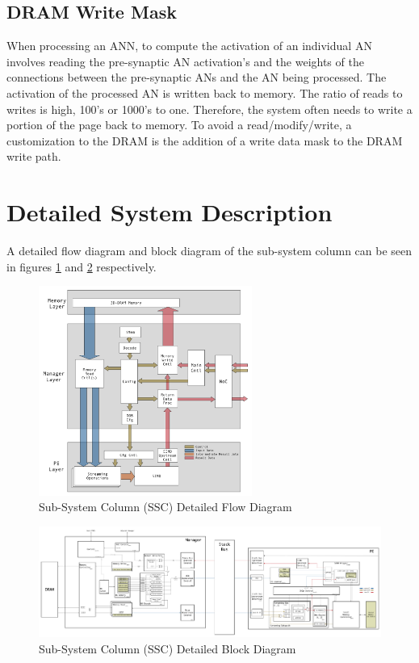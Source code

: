 \documentclass[journal]{IEEEtran}
\begin{document}
\subsection{DRAM Write Mask}
\label{sec:dramWriteMask}
When processing an ANN, to compute the activation of an individual AN involves reading the pre-synaptic AN activation's and the weights of the connections between the pre-synaptic ANs and the AN being processed. The activation of the processed AN is written back to memory. The ratio of reads to writes is high, 100's or 1000's to one. Therefore, the system often needs to write a portion of the page back to memory. To avoid a read/modify/write, a customization to the DRAM is the addition of a write data mask to the DRAM write path.


\section{Detailed System Description}
\label{sec:detailedSystemDescription}

A detailed flow diagram and block diagram of the sub-system column can be seen in figures \ref{fig:DetailedFlowDiagram} and \ref{fig:DetailedBlockDiagram} respectively.
\begin{figure}[!t]
\centering
\captionsetup{justification=centering}
\captionsetup{width=.9\linewidth}
\centerline{
\mbox{\includegraphics[width=2.75in]{DetailedFlowDiagram.jpg}}
}
\center\caption{Sub-System Column (SSC) Detailed Flow Diagram}
\label{fig:DetailedFlowDiagram}
\end{figure}

\begin{figure}[!t]
\centering
\captionsetup{justification=centering}
\centerline{
\mbox{\includegraphics[width=6.0in]{DetailedBlockDiagram.jpg}}
}
\center\caption{Sub-System Column (SSC) Detailed Block Diagram}
\label{fig:DetailedBlockDiagram}
\end{figure}
\end{document}
